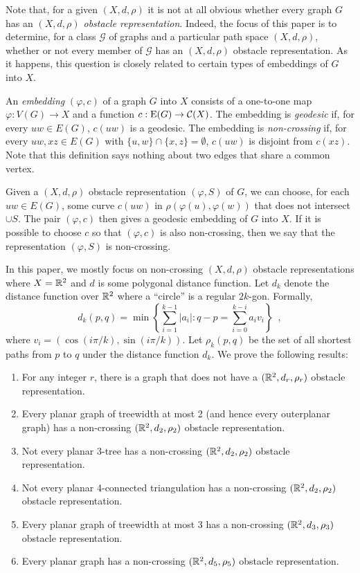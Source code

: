 \documentclass{patmorin}
\begin{document}
Note that, for a given $(X,d,\rho)$ it is not at all obvious whether every
graph $G$ has an \emph{$(X,d,\rho)$ obstacle representation}.  Indeed,
the focus of this paper is to determine, for a class $\mathcal{G}$ of
graphs and a particular path space $(X,d,\rho)$, whether or not every
member of $\mathcal{G}$ has an $(X,d,\rho)$ obstacle representation.
As it happens, this question is closely related to certain types of
embeddings of $G$ into $X$.

An \emph{embedding} $(\varphi,c)$ of a graph $G$ into $X$ consists
of a one-to-one map $\varphi:V(G)\to X$ and a function $c:\mathrm{E}(G)\to
\mathcal{C}(X)$.  The embedding is \emph{geodesic} if, for every $uw\in
E(G)$, $c(uw)$ is a geodesic.  The embedding is \emph{non-crossing} if,
for every $uw,xz\in E(G)$ with $\{u,w\}\cap \{x,z\}=\emptyset$, $c(uw)$
is disjoint from $c(xz)$.  Note that this definition says nothing about
two edges that share a common vertex.

Given a $(X,d,\rho)$ obstacle representation $(\varphi,S)$ of
$G$, we can choose, for each $uw\in E(G)$, some curve $c(uw)$ in
$\rho(\varphi(u),\varphi(w))$ that does not intersect $\cup S$.  The pair
$(\varphi,c)$ then gives a geodesic embedding of $G$ into $X$.  If it
is possible to choose $c$ so that $(\varphi,c)$ is also non-crossing,
then we say that the representation $(\varphi,S)$ is non-crossing.

In this paper, we mostly focus on non-crossing $(X,d,\rho)$
obstacle representations where $X=\mathbb{R}^2$ and $d$ is some
polygonal distance function.  Let $d_k$ denote the distance
function over $\mathbb{R}^2$ where a ``circle'' is a regular $2k$-gon.
Formally, 
\[  
   d_k(p,q)=\min\left\{\sum_{i=1}^{k-1}|a_i|: 
                        q-p=\sum_{i=0}^{k-i}a_iv_i\right\} \enspace ,
\]
where $v_i=(\cos(i\pi/k), \sin(i\pi/k))$. Let $\rho_k(p,q)$ be the set
of all shortest paths from $p$ to $q$ under the distance function $d_k$.
We prove the following results:
\begin{enumerate}
   \item For any integer $r$, there is a graph that does not have a
     $(\mathbb{R}^2,d_r,\rho_r)$ obstacle representation.
   \item Every planar graph of treewidth at most 2 (and hence every
     outerplanar graph) has a non-crossing $(\mathbb{R}^2,d_2,\rho_2)$ obstacle
     representation.
   \item Not every planar 3-tree has a non-crossing $(\mathbb{R}^2,d_2,\rho_2)$
     obstacle representation.
   \item Not every planar 4-connected triangulation has a 
     non-crossing $(\mathbb{R}^2,d_2,\rho_2)$ obstacle representation.
   \item Every planar graph of treewidth at most 3 has a 
     non-crossing $(\mathbb{R}^2,d_3,\rho_3)$ obstacle representation.
   \item Every planar graph has a non-crossing $(\mathbb{R}^2,d_{5},\rho_{5})$
     obstacle representation.
\end{enumerate}
\end{document}

